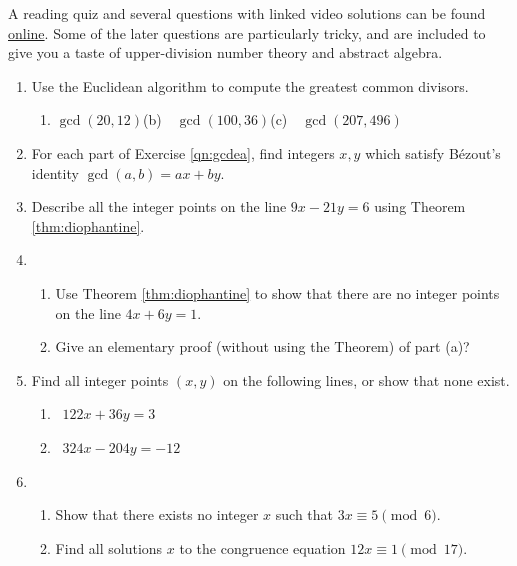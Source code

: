 

\begin{exercises}{}{}
	A reading quiz and several questions with linked video solutions can be found \href{http://www.math.uci.edu/~ndonalds/math13/selftest/3-2-euclidalg.html}{online}. Some of the later questions are particularly tricky, and are included to give you a taste of upper-division number theory and abstract algebra.

	\begin{enumerate}
	  \item\label{qn:gcdea} Use the Euclidean algorithm to compute the greatest common divisors.
	  \begin{enumerate}
	    \item $\gcd(20,12)$\qquad (b)\ \ $\gcd(100,36)$\qquad (c)\ \ $\gcd(207,496)$
	  \end{enumerate} 
	  
	  \item For each part of Exercise \ref*{qn:gcdea}, find integers $x,y$ which satisfy Bézout's identity $\gcd(a,b)=ax+by$.
	  
	  \item Describe all the integer points on the line $9x-21y=6$ using Theorem \ref{thm:diophantine}.
	  
	  
	  \item\begin{enumerate}
	    \item Use Theorem \ref{thm:diophantine} to show that there are no integer points on the line $4x+6y=1$.
	  	\item Give an elementary proof (without using the Theorem) of part (a)?
	  \end{enumerate} 
	  
		\item Find all integer points $(x,y)$ on the following lines, or show that none exist.
	    \begin{enumerate}
	      \item {} \ $122x+36y=3$
	      \setcounter{enumii}{2}
	      \item {} \ $324x-204y=-12$
	    \end{enumerate}
	  
	  \item\begin{enumerate}
	    \item Show that there exists no integer $x$ such that $3x\equiv 5\pmod 6$.
	    \item Find all solutions $x$ to the congruence equation $12x\equiv 1\pmod{17}$.
	  \end{enumerate} 
	    

\end{enumerate}
\end{exercises}
